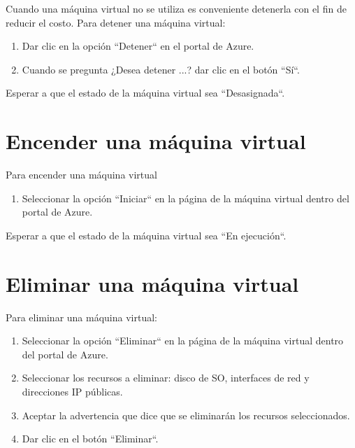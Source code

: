 Cuando una máquina virtual no se utiliza es conveniente detenerla con el fin de reducir el costo. Para detener una máquina virtual:

\begin{enumerate}

\item Dar clic en la opción ``Detener`` en el portal de Azure.

\item Cuando se pregunta ¿Desea detener ...? dar clic en el botón ``Sí``.

\end{enumerate}

Esperar a que el estado de la máquina virtual sea ``Desasignada``.

\section{Encender una máquina virtual}

Para encender una máquina virtual

\begin{enumerate}

\item Seleccionar la opción ``Iniciar`` en la página de la máquina virtual dentro del portal de Azure.

\end{enumerate}

Esperar a que el estado de la máquina virtual sea ``En ejecución``.

\section{Eliminar una máquina virtual}

Para eliminar una máquina virtual:

\begin{enumerate}

\item Seleccionar la opción ``Eliminar`` en la página de la máquina virtual dentro del portal de Azure.

\item Seleccionar los recursos a eliminar: disco de SO, interfaces de red y direcciones IP públicas.

\item Aceptar la advertencia que dice que se eliminarán los recursos seleccionados.

\item Dar clic en el botón ``Eliminar``.

\end{enumerate}

